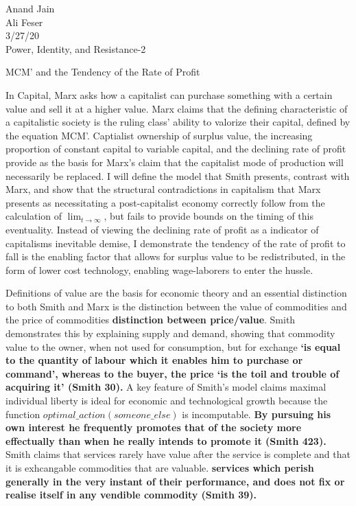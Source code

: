 \documentclass[12pt]{article}
\begin{document}
\noindent Anand Jain \\ 
Ali Feser \\
3/27/20 \\
Power, Identity, and Resistance-2 
\begin{center}
    MCM' and the Tendency of the Rate of Profit
\end{center}
In Capital, Marx asks how a capitalist can purchase something with a certain value and sell it at a higher value. 
Marx claims that the defining characteristic of a capitalistic society is the ruling class' ability to valorize their capital, defined by the equation MCM'. 
Captialist ownership of surplus value, the increasing proportion of constant capital to variable capital, and the declining rate of profit provide as the basis for Marx's claim that the capitalist mode of production will necessarily be replaced.
I will define the model that Smith presents, contrast with Marx, and show that the structural contradictions in capitalism that Marx presents as necessitating a post-capitalist economy correctly follow from the calculation of $\lim_{t \to \infty}$, but fails to provide bounds on the timing of this eventuality. 
Instead of viewing the declining rate of profit as a indicator of capitalisms inevitable demise, I demonstrate the tendency of the rate of profit to fall is the enabling factor that allows for surplus value to be redistributed, in the form of lower cost technology, enabling wage-laborers to enter the hussle. \par
Definitions of value are the basis for economic theory and an essential distinction to both Smith and Marx is the distinction between the value of commodities and the price of commodities \textbf{distinction between price/value}. 
Smith demonstrates this by explaining supply and demand, showing that commodity value to the owner, when not used for consumption, but for exchange \textbf{`is equal to the quantity of labour which it enables him to purchase or command', whereas to the buyer, the price `is the toil and trouble of acquiring it' (Smith 30).}
A key feature of Smith's model claims maximal individual liberty is ideal for economic and technological growth because the function $optimal\_action(someone\_else)$ is incomputable.
\textbf{By pursuing his own interest he frequently promotes that of the society more effectually than when he really intends to promote it (Smith 423).}
Smith claims that services rarely have value after the service is complete and that it is exhcangable commodities that are valuable.
\textbf{services which perish generally in the very instant of their performance, and does not fix or realise itself in any vendible commodity (Smith 39).}
\end{document}
